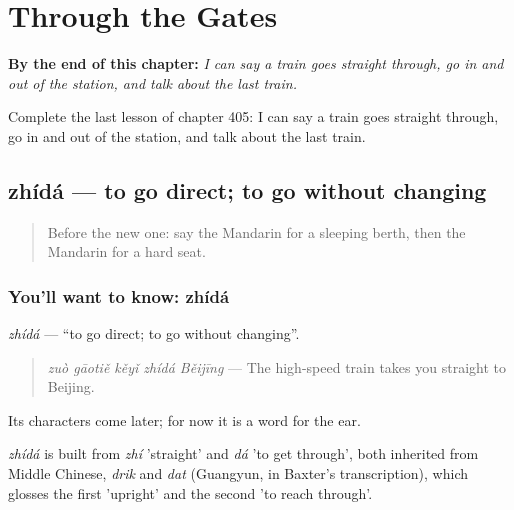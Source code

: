 
\chapter{Through the Gates}
\label{ch:zh-through-the-gates}

\begin{chapteropening}
\textbf{By the end of this chapter:} \emph{I can say a train goes straight through, go in and out of the station, and talk about the last train.}

Complete the last lesson of chapter 405: I can say a train goes straight through, go in and out of the station, and talk about the last train.
\end{chapteropening}

\section[zhídá]{zhídá — to go direct; to go without changing}

\label{lesson:ZH-C405-zhida}



\begin{quote}
Before the new one: say the Mandarin for a sleeping berth, then the Mandarin for a hard seat.
\end{quote}

\subsection*{You'll want to know: zhídá}
\emph{zhídá} — \textquotedblleft{}to go direct; to go without changing\textquotedblright{}.

\begin{quote}
\emph{zuò gāotiě kěyǐ zhídá Běijīng} — The high-speed train takes you straight to Beijing.
\end{quote}

Its characters come later; for now it is a word for the ear.

\begin{cousinweb}
\emph{zhídá} is built from \emph{zhí} 'straight' and \emph{dá} 'to get through', both inherited from Middle Chinese, \emph{drik} and \emph{dat} (Guangyun, in Baxter's transcription), which glosses the first 'upright' and the second 'to reach through'.
\end{cousinweb}

